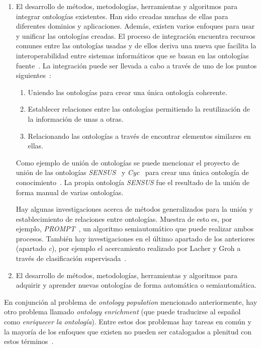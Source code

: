 \begin{enumerate}
	\item El desarrollo de métodos, metodologías, herramientas y algoritmos para integrar ontologías existentes. Han sido creadas muchas de ellas para diferentes dominios y aplicaciones. Además, existen varios enfoques para usar y unificar las ontologías creadas. El proceso de integración encuentra recursos comunes entre las ontologías usadas y de ellos deriva una nueva que facilita la interoperabilidad entre sistemas informáticos que se basan en las ontologías fuente~\cite{ref:38}. La integración puede ser llevada a cabo a través de uno de los puntos siguientes~\cite{ref:39}:
	
	\begin{enumerate}
		\item Uniendo las ontologías para crear una única ontología coherente.
		\item Establecer relaciones entre las ontologías permitiendo la reutilización de la información de unas a otras.
		\item Relacionando las ontologías a través de encontrar elementos similares en ellas.
	\end{enumerate}
	
	Como ejemplo de unión de ontologías se puede mencionar el proyecto de unión de las ontologías \textit{SENSUS}~\cite{ref:40} y \textit{Cyc}~\cite{ref:41} para crear una única ontología de conocimiento~\cite{ref:42}. La propia ontología \textit{SENSUS} fue el resultado de la unión de forma manual de varias ontologías.
	
	Hay algunas investigaciones acerca de métodos generalizados para la unión y establecimiento de relaciones entre ontologías. Muestra de esto es, por ejemplo, \textit{PROMPT}~\cite{ref:43}, un algoritmo semiautomático que puede realizar ambos procesos. También hay investigaciones en el último apartado de los anteriores (apartado \textit{c}), por ejemplo el acercamiento realizado por Lacher y Groh a través de clasificación supervisada~\cite{ref:44}.
	
	\item El desarrollo de métodos, metodologías, herramientas y algoritmos para adquirir y aprender nuevas ontologías de forma automática o semiautomática.
\end{enumerate}

En conjunción al problema de \textit{ontology population} mencionado anteriormente, hay otro problema llamado \textit{ontology enrichment} (que puede traducirse al español como \textit{enriquecer la ontología}). Entre estos dos problemas hay tareas en común y la mayoría de los enfoques que existen no pueden ser catalogados a plenitud con estos términos~\cite{ref:34}.

